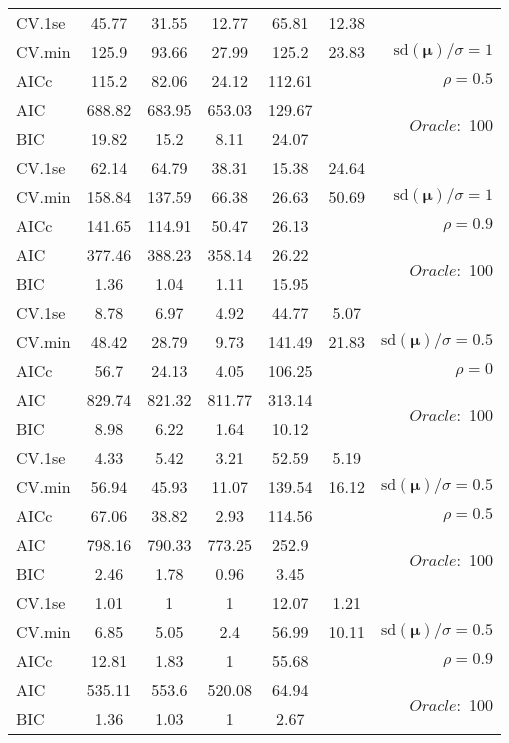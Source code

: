 \begin{table}
\begin{center}
\begin{tabular}{l*{5}{c}|r}
 \hline 
CV.1se & 45.77 & 31.55 & 12.77 & 65.81 & 12.38 & \\
CV.min & 125.9 & 93.66 & 27.99 & 125.2 & 23.83 &  $\mathrm{sd}(\mathbf{\mu})/\sigma=1$ \\
AICc & 115.2 & 82.06 & 24.12 & 112.61 & & $\rho=0.5$ \\
AIC & 688.82 & 683.95 & 653.03 & 129.67 & &  \multirow{2}{*}{$Oracle: $ 100} \\
BIC & 19.82 & 15.2 & 8.11 & 24.07 & &  \\
 \hline 
CV.1se & 62.14 & 64.79 & 38.31 & 15.38 & 24.64 & \\
CV.min & 158.84 & 137.59 & 66.38 & 26.63 & 50.69 &  $\mathrm{sd}(\mathbf{\mu})/\sigma=1$ \\
AICc & 141.65 & 114.91 & 50.47 & 26.13 & & $\rho=0.9$ \\
AIC & 377.46 & 388.23 & 358.14 & 26.22 & &  \multirow{2}{*}{$Oracle: $ 100} \\
BIC & 1.36 & 1.04 & 1.11 & 15.95 & &  \\
 \hline 
CV.1se & 8.78 & 6.97 & 4.92 & 44.77 & 5.07 & \\
CV.min & 48.42 & 28.79 & 9.73 & 141.49 & 21.83 &  $\mathrm{sd}(\mathbf{\mu})/\sigma=0.5$ \\
AICc & 56.7 & 24.13 & 4.05 & 106.25 & & $\rho=0$ \\
AIC & 829.74 & 821.32 & 811.77 & 313.14 & &  \multirow{2}{*}{$Oracle: $ 100} \\
BIC & 8.98 & 6.22 & 1.64 & 10.12 & &  \\
 \hline 
CV.1se & 4.33 & 5.42 & 3.21 & 52.59 & 5.19 & \\
CV.min & 56.94 & 45.93 & 11.07 & 139.54 & 16.12 &  $\mathrm{sd}(\mathbf{\mu})/\sigma=0.5$ \\
AICc & 67.06 & 38.82 & 2.93 & 114.56 & & $\rho=0.5$ \\
AIC & 798.16 & 790.33 & 773.25 & 252.9 & &  \multirow{2}{*}{$Oracle: $ 100} \\
BIC & 2.46 & 1.78 & 0.96 & 3.45 & &  \\
 \hline 
CV.1se & 1.01 & 1 & 1 & 12.07 & 1.21 & \\
CV.min & 6.85 & 5.05 & 2.4 & 56.99 & 10.11 &  $\mathrm{sd}(\mathbf{\mu})/\sigma=0.5$ \\
AICc & 12.81 & 1.83 & 1 & 55.68 & & $\rho=0.9$ \\
AIC & 535.11 & 553.6 & 520.08 & 64.94 & &  \multirow{2}{*}{$Oracle: $ 100} \\
BIC & 1.36 & 1.03 & 1 & 2.67 & &  \\
 \hline 
\end{tabular}
\end{center}
\vspace{-1cm}
\end{table}





